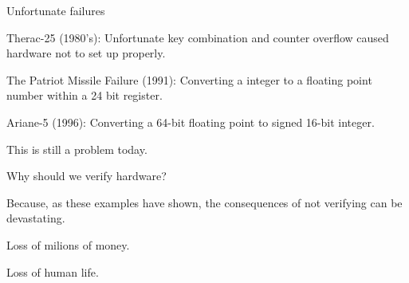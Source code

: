 \documentclass[11pt]{beamer}
\begin{document}
\begin{frame}{Unfortunate failures}
  \begin{block}{}
     Therac-25 (1980's): Unfortunate key combination and counter overflow caused hardware not to set up properly.
  \end{block}

  \pause

  \begin{block}{}
     The Patriot Missile Failure (1991): Converting a integer to a floating point number within a 24 bit register.
  \end{block}

  \pause

  \begin{block}{}
    Ariane-5 (1996): Converting a 64-bit floating point to signed 16-bit integer.
  \end{block}

  \pause

  \begin{block}{}
    This is still a problem today.
  \end{block}


\end{frame}


\begin{frame}{Why should we verify hardware?}
    \begin{block}{}
        Because, as these examples have shown, the consequences of not verifying can be devastating.
            \vspace{5mm}

        Loss of milions of money.
            \vspace{5mm}

        Loss of human life.
    \end{block}
\end{frame}
\end{document}
